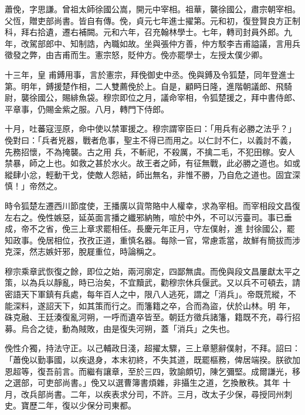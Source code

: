 \begin{pinyinscope}
 蕭俛，字思謙。曾祖太師徐國公嵩，開元中宰相。祖華，襲徐國公，肅宗朝宰相。父恆，贈吏部尚書。皆自有傳。俛，貞元七年進士擢第。元和初，復登賢良方正制科，拜右拾遺，遷右補闕。元和六年，召充翰林學士。七年，轉司封員外郎。九年，改駕部郎中、知制誥，內職如故。坐與張仲方善，仲方駁李吉甫謚議，言用兵徵發之弊，由吉甫而生。憲宗怒，貶仲方。俛亦罷學士，左授太僕少卿。



 十三年，皇
 甫鎛用事，言於憲宗，拜俛御史中丞。俛與鎛及令狐楚，同年登進士第。明年，鎛援楚作相，二人雙薦俛於上。自是，顧眄日隆，進階朝議郎、飛騎尉，襲徐國公，賜緋魚袋。穆宗即位之月，議命宰相，令狐楚援之，拜中書侍郎、平章事，仍賜金紫之服。八月，轉門下侍郎。



 十月，吐蕃寇涇原，命中使以禁軍援之。穆宗謂宰臣曰：「用兵有必勝之法乎？」俛對曰：「兵者兇器，戰者危事，聖主不得已而用之。以仁討不仁，以義討不義，先務招懷，不為掩襲。古之用
 兵，不斬祀，不殺厲，不擒二毛，不犯田稼。安人禁暴，師之上也。如救之甚於水火。故王者之師，有征無戰，此必勝之道也。如或縱肆小忿，輕動干戈，使敵人怨結，師出無名，非惟不勝，乃自危之道也。固宜深慎！」帝然之。



 時令狐楚左遷西川節度使，王播廣以貨幣賂中人權幸，求為宰相。而宰相段文昌復左右之。俛性嫉惡，延英面言播之纖邪納賄，喧於中外，不可以污臺司。事已垂成，帝不之省，俛三上章求罷相任。長慶元年正月，守左僕射，進
 封徐國公，罷知政事。俛居相位，孜孜正道，重慎名器。每除一官，常慮乖當，故鮮有簡拔而涉克深，然志嫉奸邪，脫屣重位，時論稱之。



 穆宗乘章武恢復之餘，即位之始，兩河廓定，四鄙無虞。而俛與段文昌屢獻太平之策，以為兵以靜亂，時已治矣，不宜黷武，勸穆宗休兵偃武。又以兵不可頓去，請密語天下軍鎮有兵處，每年百人之中，限八人逃死，謂之「消兵」。帝既荒縱，不能深料，遂詔天下，如其策而行之。而籓籍之卒，合而為盜，伏於山林。明
 年，硃克融、王廷湊復亂河朔，一呼而遺卒皆至。朝廷方徵兵諸籓，籍既不充，尋行招募。烏合之徒，動為賊敗，由是復失河朔，蓋「消兵」之失也。



 俛性介獨，持法守正。以己輔政日淺，超擢太驟，三上章懇辭僕射，不拜。詔曰：「蕭俛以勤事國，以疾退身，本末初終，不失其道，既罷樞務，俾居端揆。朕欲加恩超等，復吾前言。而繼有讓章，至於三四，敦諭頗切，陳乞彌堅。成爾謙光，移之選部，可吏部尚書。」俛又以選曹簿書煩雜，非攝生之道，乞換散秩。其年
 十月，改兵部尚書。二年，以疾表求分司，不許。三月，改太子少保，尋授同州刺史。寶歷二年，復以少保分司東都。




\end{pinyinscope}
